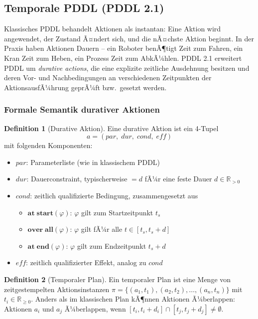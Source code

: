 ﻿\documentclass[a4paper,12pt]{article}
\theoremstyle{definition}
\newtheorem{definition}{Definition}[section]
\begin{document}
\subsection{Temporale PDDL (PDDL 2.1)}

Klassisches PDDL behandelt Aktionen als instantan: Eine Aktion wird angewendet, der Zustand Ã¤ndert sich, und die nÃ¤chste Aktion beginnt. In der Praxis haben Aktionen Dauern -- ein Roboter benÃ¶tigt Zeit zum Fahren, ein Kran Zeit zum Heben, ein Prozess Zeit zum AbkÃ¼hlen. PDDL 2.1 \cite{fox2003} erweitert PDDL um \emph{durative actions}, die eine explizite zeitliche Ausdehnung besitzen und deren Vor- und Nachbedingungen an verschiedenen Zeitpunkten der AktionsausfÃ¼hrung geprÃ¼ft bzw.\ gesetzt werden.

\subsubsection{Formale Semantik durativer Aktionen}

\begin{definition}[Durative Aktion]
Eine durative Aktion ist ein 4-Tupel
\[ a = (\mathit{par},\; \mathit{dur},\; \mathit{cond},\; \mathit{eff}) \]
mit folgenden Komponenten:
\begin{itemize}
  \item[-] $\mathit{par}$: Parameterliste (wie in klassischem PDDL)
  \item[-] $\mathit{dur}$: Dauerconstraint, typischerweise $= d$ fÃ¼r eine feste Dauer $d \in \mathbb{R}_{>0}$
  \item[-] $\mathit{cond}$: zeitlich qualifizierte Bedingung, zusammengesetzt aus
    \begin{itemize}
      \item $\mathbf{at\;start}(\varphi)$: $\varphi$ gilt zum Startzeitpunkt $t_s$
      \item $\mathbf{over\;all}(\varphi)$: $\varphi$ gilt fÃ¼r alle $t \in [t_s, t_s + d]$
      \item $\mathbf{at\;end}(\varphi)$: $\varphi$ gilt zum Endzeitpunkt $t_s + d$
    \end{itemize}
  \item[-] $\mathit{eff}$: zeitlich qualifizierter Effekt, analog zu $\mathit{cond}$
\end{itemize}
\end{definition}

\begin{definition}[Temporaler Plan]
Ein temporaler Plan ist eine Menge von zeitgestempelten Aktionsinstanzen $\pi = \{(a_1, t_1), (a_2, t_2), \ldots, (a_n, t_n)\}$ mit $t_i \in \mathbb{R}_{\geq 0}$. Anders als im klassischen Plan kÃ¶nnen Aktionen Ã¼berlappen: Aktionen $a_i$ und $a_j$ Ã¼berlappen, wenn $[t_i, t_i + d_i] \cap [t_j, t_j + d_j] \neq \emptyset$.
\end{definition}
\end{document}
